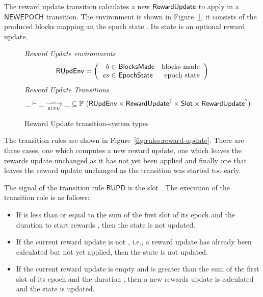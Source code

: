 The reward update transition calculates a new $\mathsf{RewardUpdate}$ to apply in a
$\mathsf{NEWEPOCH}$ transition. The environment is shown in
Figure~\ref{fig:ts-types:reward-update}, it consists of the produced blocks
mapping  an the epoch state . Its state is an optional reward
update.

\begin{figure}
  \emph{Reward Update environments}
  \begin{equation*}
    \RUpdEnv =
    \left(
      \begin{array}{r@{~\in~}lr}
        \var{b} & \BlocksMade & \text{blocks made} \\
        \var{es} & \EpochState & \text{epoch state} \\
      \end{array}
    \right)
  \end{equation*}
  \emph{Reward Update Transitions}
  \begin{equation*}
    \_ \vdash \var{\_} \trans{rupd}{\_} \var{\_} \subseteq
    \powerset (\RUpdEnv \times \RewardUpdate^? \times \Slot \times \RewardUpdate^?)
  \end{equation*}
  \caption{Reward Update transition-system types}
  \label{fig:ts-types:reward-update}
\end{figure}

The transition rules are shown in Figure~\ref{fig:rules:reward-update}. There
are three cases, one which computes a new reward update, one which leaves the
rewards update unchanged as it has not yet been applied and finally one that
leaves the reward update unchanged as the transition was started too early.

The signal of the transition rule $\mathsf{RUPD}$ is the slot . The
execution of the transition role is as follows:

\begin{itemize}
\item If  is less than or equal to the sum of the first slot of its epoch
  and the duration to start rewards \StartRewards, then the state is not
  updated.
\item If the current reward update  is not \Nothing, i.e., a reward
  update has already been calculated but not yet applied, then the state is not
  updated.
\item If the current reward update  is empty and  is greater than
  the sum of the first slot of its epoch and the duration \StartRewards, then a
  new rewards update is calculated and the state is updated.
\end{itemize}


